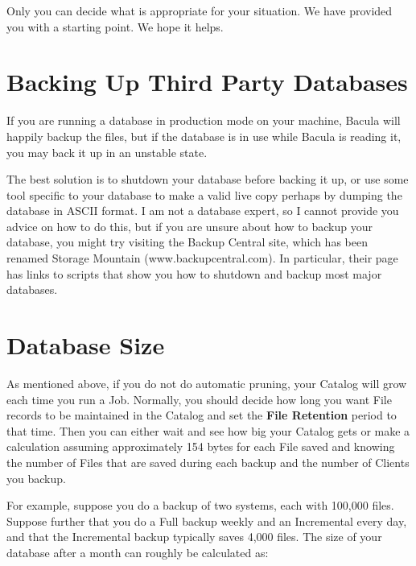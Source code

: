 Only you can decide what is appropriate for your situation. We have provided
you with a starting point.  We hope it helps.


\label{BackingUPOtherDBs}
\section{Backing Up Third Party Databases}

If you are running a database in production mode on your machine, Bacula will
happily backup the files, but if the database is in use while Bacula is
reading it, you may back it up in an unstable state. 

The best solution is to shutdown your database before backing it up, or use
some tool specific to your database to make a valid live copy perhaps by
dumping the database in ASCII format. I am not a database expert, so I cannot
provide you advice on how to do this, but if you are unsure about how to
backup your database, you might try visiting the Backup Central site, which
has been renamed Storage Mountain (www.backupcentral.com). In particular,
their 
 page has
links to scripts that show you how to shutdown and backup most major
databases. 
\label{Size}

\section{Database Size}

As mentioned above, if you do not do automatic pruning, your Catalog will grow
each time you run a Job. Normally, you should decide how long you want File
records to be maintained in the Catalog and set the {\bf File Retention}
period to that time. Then you can either wait and see how big your Catalog
gets or make a calculation assuming approximately 154 bytes for each File
saved and knowing the number of Files that are saved during each backup and
the number of Clients you backup. 

For example, suppose you do a backup of two systems, each with 100,000 files.
Suppose further that you do a Full backup weekly and an Incremental every day,
and that the Incremental backup typically saves 4,000 files. The size of your
database after a month can roughly be calculated as: 

